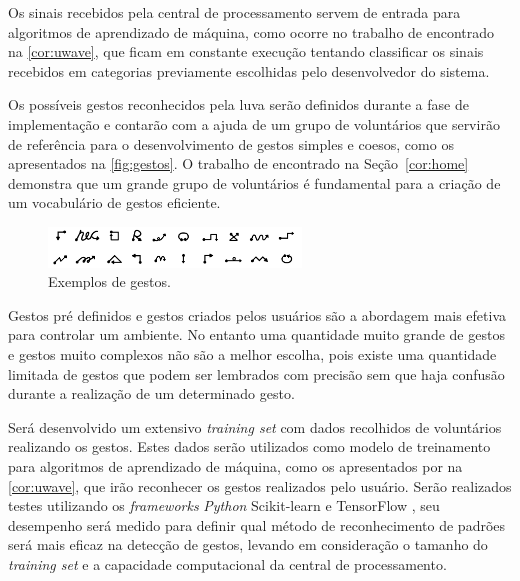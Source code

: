 Os sinais recebidos pela central de processamento servem de entrada para algoritmos de aprendizado de máquina, como ocorre no trabalho de  encontrado na \autoref{cor:uwave}, que ficam em constante execução tentando classificar os sinais recebidos em categorias previamente escolhidas pelo desenvolvedor do sistema. 


Os possíveis gestos reconhecidos pela luva serão definidos durante a fase de implementação e contarão com a ajuda de um grupo de voluntários que servirão de referência para o desenvolvimento de gestos simples e coesos, como os apresentados na \autoref{fig:gestos}. O trabalho de  encontrado na Seção~\ref{cor:home} demonstra que um grande grupo de voluntários é fundamental para a criação de um vocabulário de gestos eficiente.

\begin{figure}[ht]
    \centering
    \includegraphics[width=0.6\textwidth, keepaspectratio]{resources/gestos.png}
    \caption{Exemplos de gestos. \cite{accelerometer:2006}}
    \label{fig:gestos}
\end{figure}


Gestos pré definidos e gestos criados pelos usuários são a abordagem mais efetiva para controlar um ambiente.
No entanto uma quantidade muito grande de gestos e gestos muito complexos não são a melhor escolha, pois existe uma quantidade limitada de gestos que podem ser lembrados com precisão sem que haja confusão durante a realização de um determinado gesto.

Será desenvolvido um extensivo \textit{training set} com dados recolhidos de voluntários realizando os gestos. Estes dados serão utilizados como modelo de treinamento para algoritmos de aprendizado de máquina, como os apresentados por \cite{uwave:2009} na \autoref{cor:uwave}, que irão reconhecer os gestos realizados pelo usuário. Serão realizados testes utilizando os \textit{frameworks} \textit{Python} Scikit-learn \cite{scikit-learn} e TensorFlow \cite{tensorflow:2016}, seu desempenho será medido para definir qual método de reconhecimento de padrões será mais eficaz na detecção de gestos, levando em consideração o tamanho do \textit{training set} e a capacidade computacional da central de processamento. 

